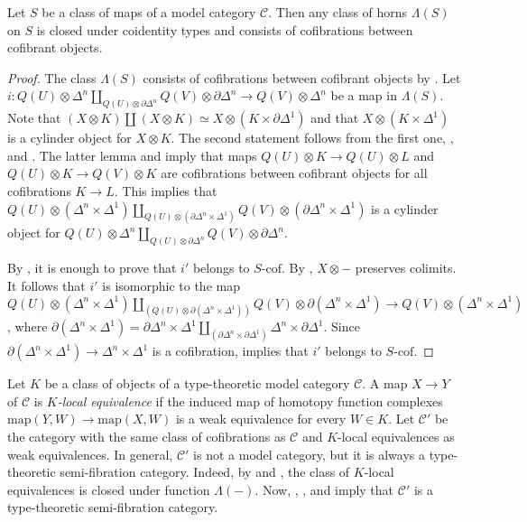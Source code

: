 \documentclass[reqno]{amsart}
\theoremstyle{definition}
\theoremstyle{remark}
\newcommand{\fs}[1]{\mathrm{#1}}
\newcommand{\scat}[1]{\mathcal{#1}}
\newcommand{\class}[2]{#1\text{-}\mathrm{#2}}
\newcommand{\I}{\mathrm{I}}
\newcommand{\Icof}[1][\I]{\class{#1}{cof}}
\numberwithin{figure}{section}
\begin{document}
\begin{lem}
Let $S$ be a class of maps of a model category $\scat{C}$.
Then any class of horns $\Lambda(S)$ on $S$ is closed under coidentity types and consists of cofibrations between cofibrant objects.
\end{lem}
\begin{proof}
The class $\Lambda(S)$ consists of cofibrations between cofibrant objects by \cite[Corollary~16.3.11]{hirschhorn}.
Let $i : Q(U) \otimes \Delta^n \amalg_{Q(U) \otimes \partial \Delta^n} Q(V) \otimes \partial \Delta^n \to Q(V) \otimes \Delta^n$ be a map in $\Lambda(S)$.
Note that $(X \otimes K) \amalg (X \otimes K) \simeq X \otimes (K \times \partial \Delta^1)$ and that $X \otimes (K \times \Delta^1)$ is a cylinder object for $X \otimes K$.
The second statement follows from the first one, \cite[Lemma~16.4.11]{hirschhorn}, and \cite[Lemma~16.4.4]{hirschhorn}.
The latter lemma and \cite[Proposition~16.5.6]{hirschhorn} imply that maps $Q(U) \otimes K \to Q(U) \otimes L$ and $Q(U) \otimes K \to Q(V) \otimes K$ are cofibrations between cofibrant objects for all cofibrations $K \to L$.
This implies that $Q(U) \otimes (\Delta^n \times \Delta^1) \amalg_{Q(U) \otimes (\partial \Delta^n \times \Delta^1)} Q(V) \otimes (\partial \Delta^n \times \Delta^1)$ is a cylinder object
for $Q(U) \otimes \Delta^n \amalg_{Q(U) \otimes \partial \Delta^n} Q(V) \otimes \partial \Delta^n$.

By , it is enough to prove that $i'$ belongs to $\Icof[S]$.
By \cite[Proposition~16.4.3]{hirschhorn}, $X \otimes -$ preserves colimits.
It follows that $i'$ is isomorphic to the map $Q(U) \otimes (\Delta^n \times \Delta^1) \amalg_{(Q(U) \otimes \partial(\Delta^n \times \Delta^1))} Q(V) \otimes \partial(\Delta^n \times \Delta^1) \to Q(V) \otimes (\Delta^n \times \Delta^1)$,
where $\partial(\Delta^n \times \Delta^1) = \partial \Delta^n \times \Delta^1 \amalg_{(\partial \Delta^n \times \partial \Delta^1)} \Delta^n \times \partial \Delta^1$.
Since $\partial(\Delta^n \times \Delta^1) \to \Delta^n \times \Delta^1$ is a cofibration, \cite[Proposition~16.4.5]{hirschhorn} implies that $i'$ belongs to $\Icof[S]$.
\end{proof}

\begin{remark}
Let $K$ be a class of objects of a type-theoretic model category $\scat{C}$.
A map $X \to Y$ of $\scat{C}$ is \emph{$K$-local equivalence} if the induced map of homotopy function complexes $\fs{map}(Y,W) \to \fs{map}(X,W)$ is a weak equivalence for every $W \in K$.
Let $\scat{C}'$ be the category with the same class of cofibrations as $\scat{C}$ and $K$-local equivalences as weak equivalences.
In general, $\scat{C}'$ is not a model category, but it is always a type-theoretic semi-fibration category.
Indeed, by \cite[Proposition~17.8.5]{hirschhorn} and \cite[Proposition~17.8.14]{hirschhorn}, the class of $K$-local equivalences is closed under function $\Lambda(-)$.
Now, , , and  imply that $\scat{C}'$ is a type-theoretic semi-fibration category.
\end{remark}
\end{document}
